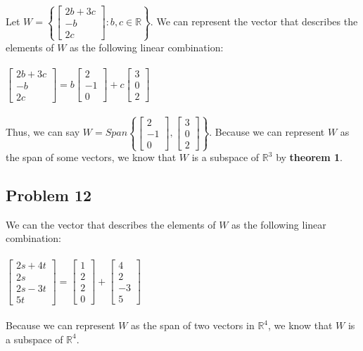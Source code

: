 \documentclass{article}%
\begin{document}
Let $W = \left\{
    \begin{bmatrix}
        2b + 3c \\
        -b \\
        2c
    \end{bmatrix}
    : b, c \in \mathbb{R}
\right\}$.
We can represent the vector that describes the elements of $W$ as the following linear combination:\\
\\
$
\begin{bmatrix}
    2b + 3c \\
    -b \\
    2c
\end{bmatrix}
=
b
\begin{bmatrix}
    2 \\ - 1 \\ 0
\end{bmatrix}
+
c
\begin{bmatrix}
    3 \\ 0 \\ 2
\end{bmatrix}
$\\
\\
Thus, we can say
$
W = Span
\left\{
    \begin{bmatrix}
        2 \\ - 1 \\ 0
    \end{bmatrix}
    ,
    \begin{bmatrix}
        3 \\ 0 \\ 2
    \end{bmatrix}
\right\}
$. Because we can represent $W$ as the span of some vectors, we know that $W$ is a subspace of $\mathbb{R}^3$ by \textbf{theorem 1}.

\subsection*{Problem 12}

We can the vector that describes the elements of $W$ as the following linear combination:\\
\\
$
\begin{bmatrix}
    2s + 4t \\
    2s \\
    2s - 3t \\
    5t
\end{bmatrix}
=
\begin{bmatrix}
    1 \\ 2 \\ 2 \\ 0
\end{bmatrix}
+
\begin{bmatrix}
    4 \\ 2 \\ -3 \\ 5
\end{bmatrix}
$\\
\\
Because we can represent $W$ as the span of two vectors in $\mathbb{R}^4$, we know that $W$ is a subspace of $\mathbb{R}^4$.
\end{document}
